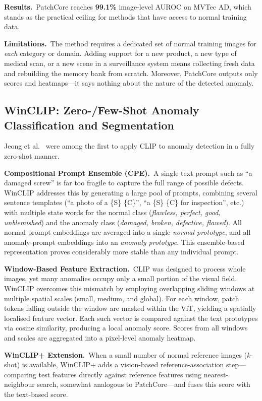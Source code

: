 \documentclass[conference]{IEEEtran}
\begin{document}
\textbf{Results.}\ PatchCore reaches \textbf{99.1\%} image-level AUROC on MVTec AD, which stands as the practical ceiling for methods that have access to normal training data.

\textbf{Limitations.}\ The method requires a dedicated set of normal training images for \textit{each} category or domain. Adding support for a new product, a new type of medical scan, or a new scene in a surveillance system means collecting fresh data and rebuilding the memory bank from scratch. Moreover, PatchCore outputs only scores and heatmaps---it says nothing about the nature of the detected anomaly.

\subsection{WinCLIP: Zero-/Few-Shot Anomaly Classification and Segmentation}

Jeong et al.~\cite{jeong2023winclip} were among the first to apply CLIP to anomaly detection in a fully zero-shot manner.

\textbf{Compositional Prompt Ensemble (CPE).}\ A single text prompt such as ``a damaged screw'' is far too fragile to capture the full range of possible defects. WinCLIP addresses this by generating a large pool of prompts, combining several sentence templates (``a photo of a \{S\} \{C\}'', ``a \{S\} \{C\} for inspection'', etc.) with multiple state words for the normal class (\textit{flawless, perfect, good, unblemished}) and the anomaly class (\textit{damaged, broken, defective, flawed}). All normal-prompt embeddings are averaged into a single \textit{normal prototype}, and all anomaly-prompt embeddings into an \textit{anomaly prototype}. This ensemble-based representation proves considerably more stable than any individual prompt.

\textbf{Window-Based Feature Extraction.}\ CLIP was designed to process whole images, yet many anomalies occupy only a small portion of the visual field. WinCLIP overcomes this mismatch by employing overlapping sliding windows at multiple spatial scales (small, medium, and global). For each window, patch tokens falling outside the window are masked within the ViT, yielding a spatially localised feature vector. Each such vector is compared against the text prototypes via cosine similarity, producing a local anomaly score. Scores from all windows and scales are aggregated into a pixel-level anomaly heatmap.

\textbf{WinCLIP+ Extension.}\ When a small number of normal reference images ($k$-shot) is available, WinCLIP+ adds a vision-based reference-association step---comparing test features directly against reference features using nearest-neighbour search, somewhat analogous to PatchCore---and fuses this score with the text-based score.
\end{document}
